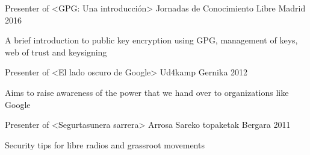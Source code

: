 \documentclass[11pt, a4paper]{awesome-cv}
\begin{document}

\begin{cventries}
    \cventry
      {Presenter of <GPG: Una introducción>} %
      {Jornadas de Conocimiento Libre} %
      {Madrid} %
      {2016} %
      {
        \begin{cvitems} %
          \item {A brief introduction to public key encryption using GPG,
              management of keys, web of trust and keysigning}
        \end{cvitems}
      }
  
    \cventry
      {Presenter of <El lado oscuro de Google>} %
      {Ud4kamp} %
      {Gernika} %
      {2012} %
      {
        \begin{cvitems} %
          \item {Aims to raise awareness of the power that we hand over to
              organizations like Google}
        \end{cvitems}
      }
  
    \cventry
      {Presenter of <Segurtasunera sarrera>} %
      {Arrosa Sareko topaketak} %
      {Bergara} %
      {2011} %
      {
        \begin{cvitems} %
          \item {Security tips for libre radios and grassroot movements}
        \end{cvitems}
      }
\end{cventries}
\end{document}
